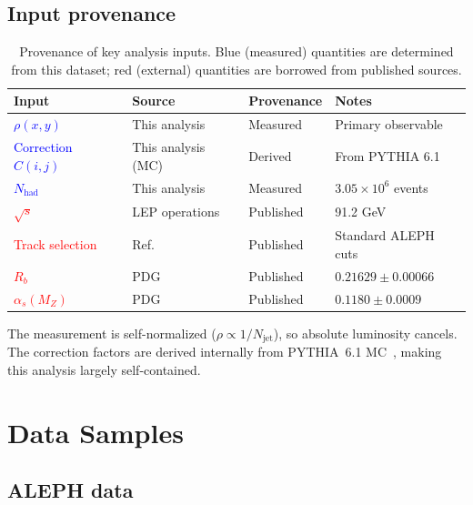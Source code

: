 \documentclass[11pt,a4paper]{article}
\newcommand{\measured}[1]{\textcolor{blue}{#1}}
\newcommand{\external}[1]{\textcolor{red}{#1}}
\begin{document}
\subsection{Input provenance}
\label{sec:provenance}

\begin{table}[htbp]
\centering
\caption{Provenance of key analysis inputs.  Blue (measured) quantities
  are determined from this dataset; red (external) quantities are borrowed
  from published sources.}
\label{tbl:provenance}
\begin{tabular}{llll}
\toprule
Input & Source & Provenance & Notes \\
\midrule
\measured{$\rho(x,y)$} & This analysis & Measured & Primary observable \\
\measured{Correction $C(i,j)$} & This analysis (MC) & Derived & From PYTHIA 6.1 \\
\measured{$N_\text{had}$} & This analysis & Measured & $3.05 \times 10^6$ events \\
\external{$\sqrt{s}$} & LEP operations & Published & 91.2 GeV \\
\external{Track selection} & Ref.~\cite{ALEPH:1998hhr,ALEPH:1998vtv} & Published & Standard ALEPH cuts \\
\external{$R_b$} & PDG~\cite{ParticleDataGroup:2024cfk} & Published & $0.21629 \pm 0.00066$ \\
\external{$\alpha_s(M_Z)$} & PDG~\cite{ParticleDataGroup:2024cfk} & Published & $0.1180 \pm 0.0009$ \\
\bottomrule
\end{tabular}
\end{table}

The measurement is self-normalized ($\rho \propto 1/N_\text{jet}$),
so absolute luminosity cancels.  The correction factors are
derived internally from PYTHIA~6.1 MC~\cite{Sjostrand:2000wi},
making this analysis largely self-contained.

\section{Data Samples}
\label{sec:data}

\subsection{ALEPH data}
\label{sec:data-aleph}
\end{document}
